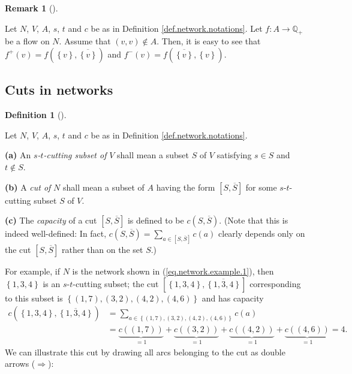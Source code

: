 \documentclass[numbers=enddot,12pt,final,onecolumn,notitlepage]{scrartcl}%
\theoremstyle{definition}
\newtheorem{defi}[theo]{Definition}
\newenvironment{definition}[1][]
{\begin{defi}[#1]\begin{leftbar}}
{\end{leftbar}\end{defi}}
\newtheorem{remk}[theo]{Remark}
\newenvironment{remark}[1][]
{\begin{remk}[#1]\begin{leftbar}}
{\end{leftbar}\end{remk}}
\let\sumnonlimits\sum
\renewcommand{\sum}{\sumnonlimits\limits}
\begin{document}
\begin{remark}
Let $N$, $V$, $A$, $s$, $t$ and $c$ be as in Definition
\ref{def.network.notations}. Let $f:A\rightarrow\mathbb{Q}_{+}$ be a flow on
$N$. Assume that $\left(  v,v\right)  \notin A$. Then, it is easy to see that
$f^{+}\left(  v\right)  =f\left(  \left\{  v\right\}  ,\overline{\left\{
v\right\}  }\right)  $ and $f^{-}\left(  v\right)  =f\left(  \overline
{\left\{  v\right\}  },\left\{  v\right\}  \right)  $.
\end{remark}

\subsection{Cuts in networks}

\begin{definition}
\label{def.cuts}Let $N$, $V$, $A$, $s$, $t$ and $c$ be as in Definition
\ref{def.network.notations}.

\textbf{(a)} An $s$\textit{-}$t$\textit{-cutting subset of }$V$ shall mean a
subset $S$ of $V$ satisfying $s\in S$ and $t\notin S$.

\textbf{(b)} A \textit{cut of }$N$ shall mean a subset of $A$ having the form
$\left[  S,\overline{S}\right]  $ for some $s$-$t$-cutting subset $S$ of $V$.

\textbf{(c)} The \textit{capacity} of a cut $\left[  S,\overline{S}\right]  $
is defined to be $c\left(  S,\overline{S}\right)  $. (Note that this is indeed
well-defined: In fact, $c\left(  S,\overline{S}\right)  =\sum_{a\in\left[
S,\overline{S}\right]  }c\left(  a\right)  $ clearly depends only on the cut
$\left[  S,\overline{S}\right]  $ rather than on the set $S$.)
\end{definition}

For example, if $N$ is the network shown in (\ref{eq.network.example.1}), then
$\left\{  1,3,4\right\}  $ is an $s$-$t$-cutting subset; the cut $\left[
\left\{  1,3,4\right\}  ,\overline{\left\{  1,3,4\right\}  }\right]  $
corresponding to this subset is $\left\{  \left(  1,7\right)  ,\left(
3,2\right)  ,\left(  4,2\right)  ,\left(  4,6\right)  \right\}  $ and has
capacity%
\begin{align*}
c\left(  \left\{  1,3,4\right\}  ,\overline{\left\{  1,3,4\right\}  }\right)
&  =\sum_{a\in\left\{  \left(  1,7\right)  ,\left(  3,2\right)  ,\left(
4,2\right)  ,\left(  4,6\right)  \right\}  }c\left(  a\right) \\
&  =\underbrace{c\left(  \left(  1,7\right)  \right)  }_{=1}%
+\underbrace{c\left(  \left(  3,2\right)  \right)  }_{=1}+\underbrace{c\left(
\left(  4,2\right)  \right)  }_{=1}+\underbrace{c\left(  \left(  4,6\right)
\right)  }_{=1}=4.
\end{align*}
We can illustrate this cut by drawing all arcs belonging to the cut as double
arrows ($\Longrightarrow$):%
\end{document}

